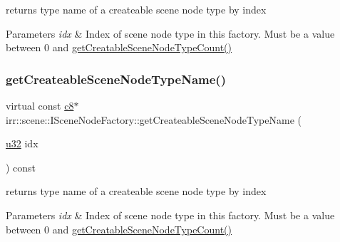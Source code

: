 returns type name of a createable scene node type by index 


\begin{DoxyParams}{Parameters}
{\em idx} & Index of scene node type in this factory. Must be a value between 0 and \hyperlink{classirr_1_1scene_1_1ISceneNodeFactory_a3c1be487fb0169ee9fbb7169c451d16e}{get\+Creatable\+Scene\+Node\+Type\+Count()} \\
\hline
\end{DoxyParams}
\mbox{\label{classirr_1_1scene_1_1ISceneNodeFactory_a259f156cc367a9a89f79159ad2b665ac}} 
\subsubsection{\texorpdfstring{get\+Createable\+Scene\+Node\+Type\+Name()}{getCreateableSceneNodeTypeName()}\hspace{0.1cm}{\footnotesize\ttfamily [2/4]}}
{\footnotesize\ttfamily virtual const \hyperlink{namespaceirr_a9395eaea339bcb546b319e9c96bf7410}{c8}$\ast$ irr\+::scene\+::\+I\+Scene\+Node\+Factory\+::get\+Createable\+Scene\+Node\+Type\+Name (\begin{DoxyParamCaption}\item[{\hyperlink{namespaceirr_a0416a53257075833e7002efd0a18e804}{u32}}]{idx }\end{DoxyParamCaption}) const\hspace{0.3cm}{\ttfamily [pure virtual]}}



returns type name of a createable scene node type by index 


\begin{DoxyParams}{Parameters}
{\em idx} & Index of scene node type in this factory. Must be a value between 0 and \hyperlink{classirr_1_1scene_1_1ISceneNodeFactory_a3c1be487fb0169ee9fbb7169c451d16e}{get\+Creatable\+Scene\+Node\+Type\+Count()} \\
\hline
\end{DoxyParams}
\mbox{\label{classirr_1_1scene_1_1ISceneNodeFactory_addc09a5ab7a8d8b65182fbaa09c88b6f}} 
